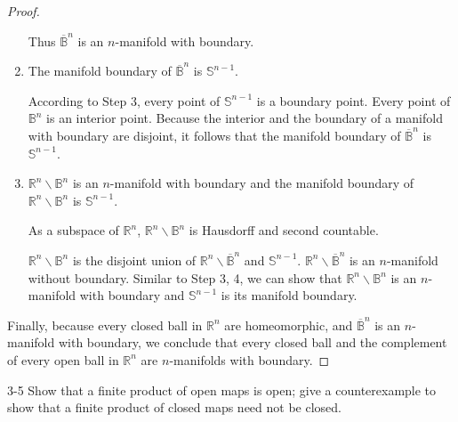 \begin{proof}
\begin{enumerate}[label={\textbf{Step \arabic*.}},itemindent=1cm]
              Thus $\overline{\mathbb{B}}^{n}$ is an $n$-manifold with boundary.
        \item The manifold boundary of $\overline{\mathbb{B}}^{n}$ is $\mathbb{S}^{n-1}$.

              According to Step 3, every point of $\mathbb{S}^{n-1}$ is a boundary point. Every point of $\mathbb{B}^{n}$ is an interior point. Because the interior and the boundary of a manifold with boundary are disjoint, it follows that the manifold boundary of $\overline{\mathbb{B}}^{n}$ is $\mathbb{S}^{n-1}$.
        \item $\mathbb{R}^{n}\smallsetminus \mathbb{B}^{n}$ is an $n$-manifold with boundary and the manifold boundary of $\mathbb{R}^{n}\smallsetminus \mathbb{B}^{n}$ is $\mathbb{S}^{n-1}$.

              As a subspace of $\mathbb{R}^{n}$, $\mathbb{R}^{n}\smallsetminus \mathbb{B}^{n}$ is Hausdorff and second countable.

              $\mathbb{R}^{n}\smallsetminus\mathbb{B}^{n}$ is the disjoint union of $\mathbb{R}^{n}\smallsetminus\overline{\mathbb{B}}^{n}$ and $\mathbb{S}^{n-1}$. $\mathbb{R}^{n}\smallsetminus\overline{\mathbb{B}}^{n}$ is an $n$-manifold without boundary. Similar to Step 3, 4, we can show that $\mathbb{R}^{n}\smallsetminus \mathbb{B}^{n}$ is an $n$-manifold with boundary and $\mathbb{S}^{n-1}$ is its manifold boundary.
    \end{enumerate}

    Finally, because every closed ball in $\mathbb{R}^{n}$ are homeomorphic, and $\overline{\mathbb{B}}^{n}$ is an $n$-manifold with boundary, we conclude that every closed ball and the complement of every open ball in $\mathbb{R}^{n}$ are $n$-manifolds with boundary.
\end{proof}

\begin{problem}{3-5}\label{problem:3-5}
Show that a finite product of open maps is open; give a counterexample to show that a finite product of closed maps need not be closed.
\end{problem}

